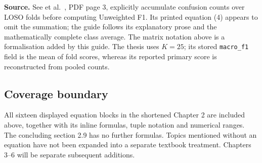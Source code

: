 \documentclass[11pt,a4paper]{article}
\numberwithin{equation}{section}
\begin{document}
\textbf{Source.} See et al.~\cite{see2019}, PDF page 3, explicitly accumulate
confusion counts over LOSO folds before computing Unweighted F1. Its printed
equation (4) appears to omit the summation; the guide follows its explanatory
prose and the mathematically complete class average. The matrix notation above
is a formalisation added by this guide. The thesis uses $K=25$; its stored
\texttt{macro\_f1} field is the mean of fold scores, whereas its reported
primary score is reconstructed from pooled counts.

\subsection{Coverage boundary}
All sixteen displayed equation blocks in the shortened Chapter 2 are included
above, together with its inline formulas, tuple notation and numerical ranges.
The concluding section 2.9 has no further formulas. Topics mentioned without
an equation have not been expanded into a separate textbook treatment.
Chapters 3--6 will be separate subsequent additions.
\end{document}
